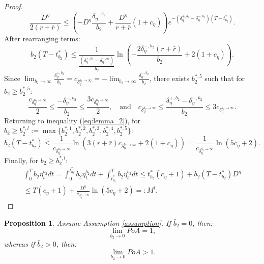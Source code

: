 \documentclass[11pt]{article}
\newtheorem{proposition}{Proposition}
\begin{document}
\begin{proof}
	$$\frac{D^\eta}{2(r+\bar{r})}\leq \left(-D^\eta\frac{\delta^{-,b_2}_\eta }{b_2}+\frac{D^\eta}{r+\bar{r}}(1+c_\eta) \right) e^{-\left(\delta^{+,b_2}_\eta -\delta^{-,b_2}_\eta\right)(T-t^*_{b_2})}.$$
	After rearranging terms:
	\begin{equation}
	b_2(T-t^*_{b_2})\leq \frac{1}{\frac{\left(\delta^{+,b_2}_\eta -\delta^{-,b_2}_\eta\right)}{b_2}} \ln \left( -\frac{2\delta^{-,b_2}_\eta(r+\bar{r})}{b_2}+2(1+c_\eta) \right).
	\label{eq:lemma_2}
	\end{equation}
	Since $\lim_{b_2 \to \infty}\frac{\delta^{+,b_2}_\eta}{b_2}=c_{\delta_\eta^{b_2 \to \infty}}=-\lim_{b_2 \to \infty}\frac{\delta^{-,b_2}_\eta}{b_2}$, there exists $b_2^{*,5}$ such that for $b_2 \geq b_2^{*,5}$:
	$$\frac{c_{\delta_\eta^{b_2 \to \infty}}}{2} \leq \frac{-\delta^{-,b_2}_\eta}{b_2} \leq \frac{3c_{\delta_\eta^{b_2 \to \infty}}}{2}, \quad \text{and} \quad c_{\delta_\eta^{b_2 \to \infty}} \leq \frac{\delta^{+,b_2}_\eta-\delta^{-,b_2}_\eta}{b_2} \leq 3c_{\delta_\eta^{b_2 \to \infty}}.$$	
	Returning to inequality (\ref{eq:lemma_2}), for $b_2 \geq b_2^{*,l}:=\max \{b_2^{*,1},b_2^{*,2},b_2^{*,3},b_2^{*,4},b_2^{*,5}\}$:
	$$ b_2(T-t^*_{b_2})\leq \frac{1}{c_{\delta_\eta^{b_2 \to \infty}}} \ln \left(3 (r+\bar{r})c_{\delta_\eta^{b_2 \to \infty}}+2(1+c_\eta) \right)=\frac{1}{c_{\delta_\eta^{b_2 \to \infty}}} \ln \left(5c_\eta+2 \right).$$
	Finally, for $b_2 \geq b_2^{*,l}$:
	\begin{equation*}
	\begin{split}
	\int_0^T b_2 \eta^{b_2}_t dt=\int_0^{t^*_{b_2}} b_2 \eta^{b_2}_t dt+\int_{t^*_{b_2}}^T b_2 \eta^{b_2}_t dt \leq t^*_{b_2}(c_\eta+1)+b_2 (T-t^*_{b_2})D^\eta \\
	\leq T(c_\eta+1)+\frac{D^\eta}{c_{\delta_\eta^{b_2 \to \infty}}} \ln \left( 5c_\eta+2 \right)=:M^l.
	\end{split}
	\end{equation*}
\end{proof}


\begin{proposition}
	Assume Assumption \ref{assumption}. If $\bar{b}_2= 0$, then:
	\begin{equation*}
	\lim_{b_2 \to 0} PoA = 1,
	\end{equation*}
	whereas if $\bar{b}_2 > 0$, then:
	\begin{equation*}
	\lim_{b_2 \to 0} PoA > 1.
	\end{equation*}
\label{prop:b2_to_0}
\end{proposition}
\end{document}
